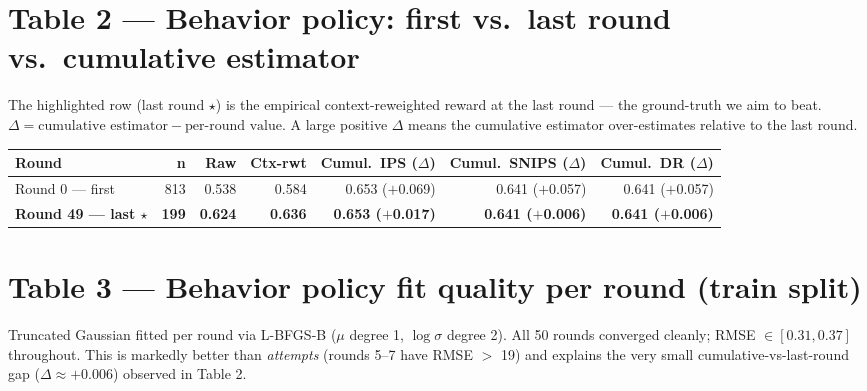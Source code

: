 \documentclass[11pt]{article}
\begin{document}
\section*{Table 2 — Behavior policy: first vs.\ last round vs.\ cumulative estimator}

{\small The highlighted row (last round $\star$) is the empirical context-reweighted reward at the
last round --- the ground-truth we aim to beat.
$\Delta = \text{cumulative estimator} - \text{per-round value}$.
A large positive $\Delta$ means the cumulative estimator over-estimates relative to the last round.}

\bigskip
\begin{tabular}{lrrrrrr}
\toprule
\textbf{Round} & \textbf{n} & \textbf{Raw} & \textbf{Ctx-rwt} & \textbf{Cumul.\ IPS ($\Delta$)} & \textbf{Cumul.\ SNIPS ($\Delta$)} & \textbf{Cumul.\ DR ($\Delta$)} \\
\midrule
Round 0 --- first & 813 & 0.538 & 0.584 & 0.653 ($+$0.069) & 0.641 ($+$0.057) & 0.641 ($+$0.057) \\
\rowcolor{groundbg}
\textbf{Round 49 --- last $\star$} & \textbf{199} & \textbf{0.624} & \textbf{0.636} & \textbf{0.653 ($+$0.017)} & \textbf{0.641 ($+$0.006)} & \textbf{0.641 ($+$0.006)} \\
\bottomrule
\end{tabular}

\section*{Table 3 — Behavior policy fit quality per round (train split)}

{\small Truncated Gaussian fitted per round via L-BFGS-B ($\mu$ degree 1, $\log\sigma$ degree 2).
All 50 rounds converged cleanly; RMSE $\in [0.31, 0.37]$ throughout.
This is markedly better than \textit{attempts} (rounds 5--7 have RMSE $>$ 19)
and explains the very small cumulative-vs-last-round gap ($\Delta \approx +0.006$)
observed in Table 2.}
\end{document}
